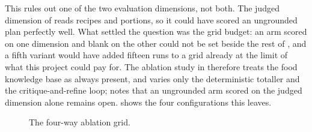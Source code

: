 This rules out one of the two evaluation dimensions, not both. The judged dimension of  reads recipes and portions, so it could have scored an ungrounded plan perfectly well. What settled the question was the grid budget: an arm scored on one dimension and blank on the other could not be set beside the rest of , and a fifth variant would have added fifteen runs to a grid already at the limit of what this project could pay for. The ablation study in  therefore treats the food knowledge base as always present, and varies only the deterministic totaller and the critique-and-refine loop;  notes that an ungrounded arm scored on the judged dimension alone remains open.  shows the four configurations this leaves.

\begin{figure}[htbp]
    \centering
    
    \caption{The four-way ablation grid.}
    \label{fig:diagram-variants}
\end{figure}
